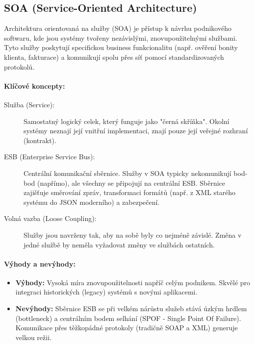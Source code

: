 \subsection{SOA (Service-Oriented Architecture)}
Architektura orientovaná na služby (SOA) je přístup k návrhu podnikového softwaru, kde jsou systémy tvořeny nezávislými, znovupoužitelnými službami. Tyto služby poskytují specifickou business funkcionalitu (např. ověření bonity klienta, fakturace) a komunikují spolu přes síť pomocí standardizovaných protokolů. 

\paragraph*{Klíčové koncepty:}
\begin{description}
    \item[Služba (Service):] Samostatný logický celek, který funguje jako "černá skříňka". Okolní systémy neznají její vnitřní implementaci, znají pouze její veřejné rozhraní (kontrakt).
    \item[ESB (Enterprise Service Bus):] Centrální komunikační sběrnice. Služby v SOA typicky nekomunikují bod-bod (napřímo), ale všechny se připojují na centrální ESB. Sběrnice zajišťuje směrování zpráv, transformaci formátů (např. z XML starého systému do JSON moderního) a zabezpečení.
    \item[Volná vazba (Loose Coupling):] Služby jsou navrženy tak, aby na sobě byly co nejméně závislé. Změna v jedné službě by neměla vyžadovat změny ve službách ostatních.
\end{description}

\paragraph*{Výhody a nevýhody:}
\begin{itemize}
    \item \textbf{Výhody:} Vysoká míra znovupoužitelnosti napříč celým podnikem. Skvělé pro integraci historických (legacy) systémů s novými aplikacemi.
    \item \textbf{Nevýhody:} Sběrnice ESB se při velkém nárůstu služeb stává úzkým hrdlem (bottleneck) a centrálním bodem selhání (SPOF - Single Point Of Failure). Komunikace přes těžkopádné protokoly (tradičně SOAP a XML) generuje velkou režii.
\end{itemize}


